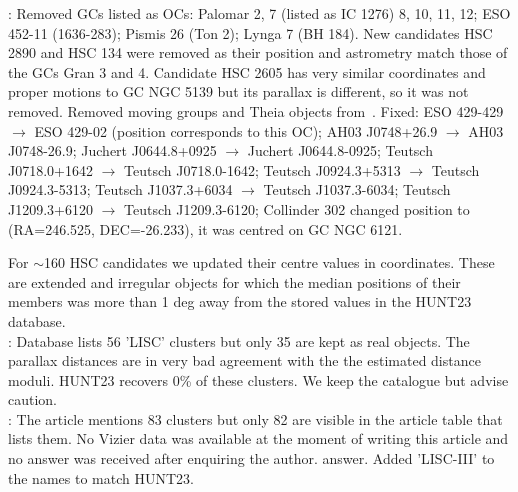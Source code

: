 \documentclass[fleqn,usenatbib]{mnras}
\begin{document}
\noindent\cite{Hunt_2023}: Removed GCs listed as OCs: Palomar 2, 7 (listed
as IC 1276) 8, 10, 11, 12; ESO 452-11 (1636-283); Pismis 26 (Ton 2); Lynga 7 (BH
184). New candidates HSC 2890 and HSC 134 were removed as their position and
astrometry match those of the GCs Gran 3 and 4. Candidate HSC 2605
has very similar coordinates and proper motions to GC NGC 5139 but its
parallax is different, so it was not removed.
%
Removed moving groups and Theia objects from~\cite{Kounkel_2020}.
Fixed: ESO 429-429 $\rightarrow$ ESO 429-02 (position corresponds to this OC);
AH03 J0748+26.9 $\rightarrow$ AH03 J0748-26.9;
Juchert J0644.8+0925 $\rightarrow$ Juchert J0644.8-0925;
Teutsch J0718.0+1642 $\rightarrow$ Teutsch J0718.0-1642;
Teutsch J0924.3+5313 $\rightarrow$ Teutsch J0924.3-5313;
Teutsch J1037.3+6034 $\rightarrow$ Teutsch J1037.3-6034;
Teutsch J1209.3+6120 $\rightarrow$ Teutsch J1209.3-6120;
Collinder 302 changed position to (RA=246.525, DEC=-26.233), it was centred
on GC NGC 6121.

For $\sim$160 HSC candidates we updated their centre values in coordinates.
These are extended and irregular objects for which the median positions of their
members was more than 1 deg away from the stored values in the HUNT23
database.\\

\noindent\cite{Li_2023}: Database lists 56 'LISC' clusters but only 35 are kept as real
objects. The parallax distances are in very bad agreement with the the estimated
distance moduli. HUNT23 recovers 0\% of these clusters. We keep the catalogue
but advise caution.\\

\noindent\cite{Chi_2023}: The article mentions 83 clusters but only 82 are visible in the
article table that lists them. No Vizier data was available at the moment of
writing this article and no answer was received after enquiring the author.
answer. Added 'LISC-III' to the names to match HUNT23.




\bsp	%
\label{lastpage}
\end{document}
